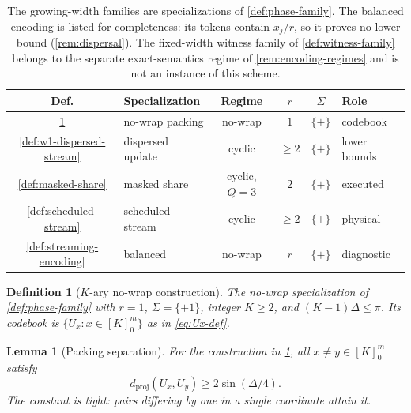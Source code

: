 \documentclass[a4paper,twocolumn,10pt,unpublished]{quantumarticle}
\newtheorem{definition}{Definition}
\newtheorem{lemma}{Lemma}
\begin{document}
\begin{table}[tbp]
\centering
\footnotesize
\setlength{\tabcolsep}{3.5pt}
\begin{tabular}{@{}clcccl@{}}
\toprule
Def. & Specialization & Regime & $r$ & $\Sigma$ & Role \\
\midrule
\ref{def:packing-construction} & no-wrap packing & no-wrap & $1$ & $\{+\}$ & codebook \\
\ref{def:w1-dispersed-stream} & dispersed update & cyclic & $\geq2$ & $\{+\}$ & lower bounds \\
\ref{def:masked-share} & masked share & cyclic, $Q{=}3$ & $2$ & $\{+\}$ & executed \\
\ref{def:scheduled-stream} & scheduled stream & cyclic & $\geq2$ & $\{\pm\}$ & physical \\
\ref{def:streaming-encoding} & balanced & no-wrap & $r$ & $\{+\}$ & diagnostic \\
\bottomrule
\end{tabular}
\caption{The growing-width families are specializations of
\cref{def:phase-family}.  The balanced encoding is listed for
completeness: its tokens contain $x_j/r$, so it proves no lower bound
(\cref{rem:dispersal}).  The fixed-width witness family of
\cref{def:witness-family} belongs to the separate exact-semantics regime
of \cref{rem:encoding-regimes} and is not an instance of this scheme.}
\label{tab:family-specializations}
\end{table}

\begin{definition}[$K$-ary no-wrap construction]
\label{def:packing-construction}
The no-wrap specialization of \cref{def:phase-family} with $r=1$,
$\Sigma=\{+1\}$, integer $K\geq2$, and $(K-1)\Delta\leq\pi$.  Its
codebook is $\{U_x:x\in[K]_0^m\}$ as in \eqref{eq:Ux-def}.
\end{definition}

\begin{lemma}[Packing separation]
\label{lem:packing-separation}
For the construction in \cref{def:packing-construction},
all $x\neq y\in[K]_0^m$ satisfy
\begin{equation}\label{eq:Kary-separation}
 d_{\mathrm{proj}}(U_x,U_y)\geq2\sin(\Delta/4).
\end{equation}
The constant is tight: pairs differing by one in a single coordinate
attain it.
\end{lemma}
\end{document}
